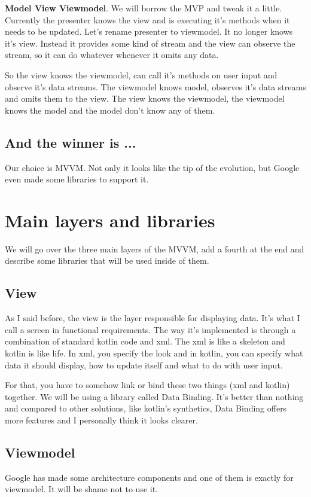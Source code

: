 \textbf{Model View Viewmodel}.
We will borrow the MVP and tweak it a little. Currently the presenter knows the view and is executing it's methods when it needs to be updated.
Let's rename presenter to viewmodel. It no longer knows it's view.
Instead it provides some kind of stream and the view can observe the stream, so it can do whatever whenever it omits any data.

So the view knows the viewmodel, can call it's methods on user input and observe it's data streams.
The viewmodel knows model, observes it's data streams and omits them to the view.
The view knows the viewmodel, the viewmodel knows the model and the model don't know any of them.

\subsection{And the winner is ...}
Our choice is MVVM. Not only it looks like the tip of the evolution, but Google even made some libraries to support it.

\section{Main layers and libraries}
We will go over the three main layers of the MVVM, add a fourth at the end and describe some libraries that will be used inside of them.

\subsection{View}
As I said before, the view is the layer responsible for displaying data. It's what I call a screen in functional requirements.
The way it's implemented is through a combination of standard kotlin code and xml.
The xml is like a skeleton and kotlin is like life. In xml, you specify the look and in kotlin, you can specify what data it should display, how to update itself and what to do with user input.

For that, you have to somehow link or bind these two things (xml and kotlin) together.
We will be using a library called Data Binding. It's better than nothing and compared to other solutions, like kotlin's synthetics, Data Binding offers more features and I personally think it looks clearer.

\subsection{Viewmodel}
Google has made some architecture components and one of them is exactly for viewmodel.
It will be shame not to use it.


